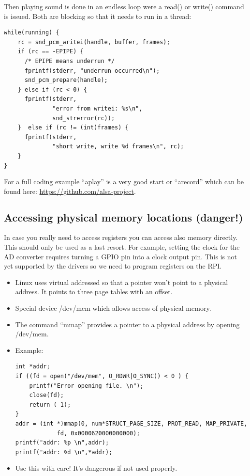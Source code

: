 \documentclass[12pt]{report}
\begin{document}
Then playing sound is done in an endless loop were a read()
or write() command is issued. Both are blocking so that
it needs to run in a thread:

\begin{verbatim}
while(running) {
    rc = snd_pcm_writei(handle, buffer, frames);
    if (rc == -EPIPE) {
      /* EPIPE means underrun */
      fprintf(stderr, "underrun occurred\n");
      snd_pcm_prepare(handle);
    } else if (rc < 0) {
      fprintf(stderr,
              "error from writei: %s\n",
              snd_strerror(rc));
    }  else if (rc != (int)frames) {
      fprintf(stderr,
              "short write, write %d frames\n", rc);
    }
}
\end{verbatim}

For a full coding example ``aplay'' is a very
good start or ``arecord'' which can be found here:
\url{https://github.com/alsa-project}.




\subsection{Accessing physical memory locations (danger!)}
In case you really need to access registers you can access
also memory directly. This should only be used as a last resort.
For example, setting the clock for the AD converter requires
turning a GPIO pin into a clock output pin. This is not yet
supported by the drivers so we need to program registers
on the RPI.
\begin{itemize}
\item Linux uses virtual addressed so that a pointer won't
point to a physical address. It points to three page
tables with an offset.
\item Special device /dev/mem which allows access of physical
memory.
\item The command ``mmap'' provides a pointer to a physical
address by opening /dev/mem.
\item Example:
\begin{verbatim}
int *addr;
if ((fd = open("/dev/mem", O_RDWR|O_SYNC)) < 0 ) {
    printf("Error opening file. \n");
    close(fd);
    return (-1);
}
addr = (int *)mmap(0, num*STRUCT_PAGE_SIZE, PROT_READ, MAP_PRIVATE,
            fd, 0x0000620000000000);
printf("addr: %p \n",addr);
printf("addr: %d \n",*addr);
\end{verbatim}
\item Use this with care! It's dangerous if not used properly.
\end{itemize}
\end{document}
